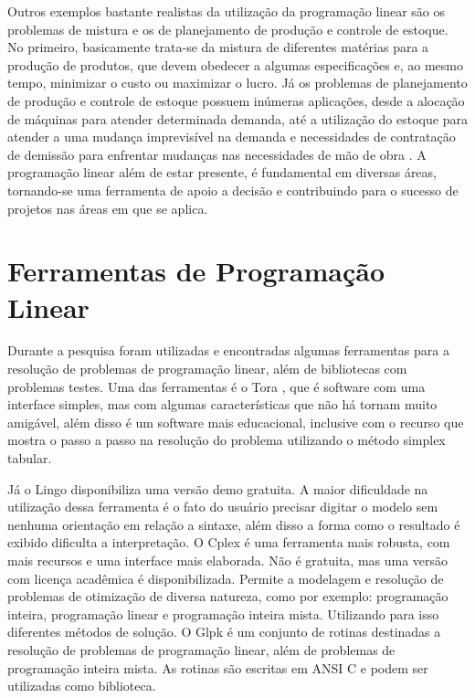 Outros exemplos bastante realistas da utilização da programação linear são os problemas de mistura e os de planejamento de produção e controle de estoque. No primeiro, basicamente trata-se da mistura de diferentes matérias para a produção de produtos, que devem obedecer a algumas especificações e, ao mesmo tempo, minimizar o custo ou maximizar o lucro. Já os problemas de planejamento de produção e controle de estoque possuem inúmeras aplicações, desde a alocação de máquinas para atender determinada demanda, até a utilização do estoque para atender a uma mudança imprevisível na demanda e necessidades de contratação de demissão para enfrentar mudanças nas necessidades de mão de obra \cite{Taha}.
A programação linear além de estar presente, é fundamental em diversas áreas, tornando-se uma ferramenta de apoio a decisão e contribuindo para o sucesso de projetos nas áreas em que se aplica.

\section{Ferramentas de Programação Linear}
Durante a pesquisa foram utilizadas e encontradas algumas ferramentas para a resolução de problemas de programação linear, além de bibliotecas com problemas testes.
Uma das ferramentas é o Tora \cite{Taha}, que é software com uma interface simples, mas com algumas características que não há tornam muito amigável, além disso é um software mais educacional, inclusive com o recurso que mostra o passo a passo na resolução do problema utilizando o método simplex tabular.

\begin{center}
\end{center}

Já o Lingo disponibiliza uma versão demo gratuita. A maior dificuldade na utilização dessa ferramenta é o fato do usuário precisar digitar o modelo sem nenhuma orientação em relação a sintaxe, além disso a forma como o resultado é exibido dificulta a interpretação.
O Cplex é uma ferramenta mais robusta, com mais recursos e uma interface mais elaborada. Não é gratuita, mas uma versão com licença acadêmica é disponibilizada. Permite a modelagem e resolução de problemas de otimização de diversa natureza, como por exemplo: programação inteira, programação linear e programação inteira mista. Utilizando para isso diferentes métodos de solução.
O Glpk é um conjunto de rotinas destinadas a resolução de problemas de programação linear, além de problemas de programação inteira mista. As rotinas são escritas em ANSI C e podem ser utilizadas como biblioteca.

